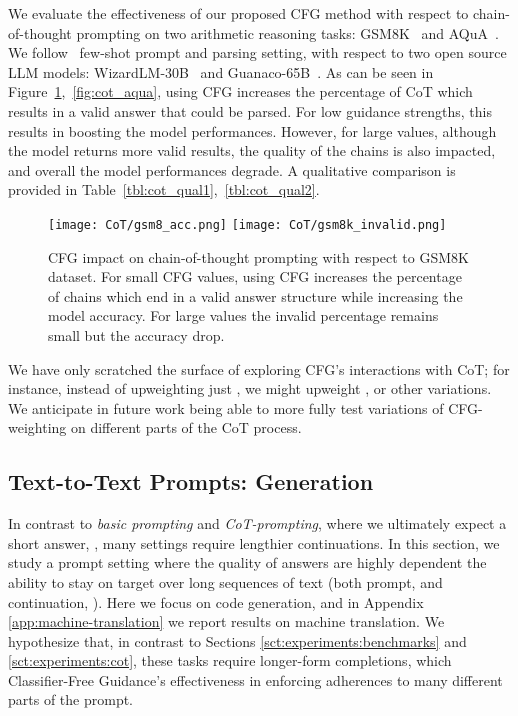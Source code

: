 \documentclass{article}
\begin{document}
 We evaluate the effectiveness of our proposed CFG method with respect to chain-of-thought prompting on two arithmetic reasoning tasks: GSM8K~\cite{gsm8k} and AQuA~\cite{aqua}. We follow~\cite{self-consistency} few-shot prompt and parsing setting, with respect to two open source LLM models: WizardLM-30B~\cite{xu2023wizardlm} and Guanaco-65B~\cite{guancano}.
As can be seen in Figure~\ref{fig:cot_GSM8K},~\ref{fig:cot_aqua}, using CFG increases the percentage of CoT which results in a valid answer that could be parsed. For low guidance strengths, this results in boosting the model performances. However, for large values, although the model returns more valid results, the quality of the chains is also impacted, and overall the model performances degrade. A qualitative comparison is provided in Table~\ref{tbl:cot_qual1},~\ref{tbl:cot_qual2}.  

\begin{figure}[!ht]
    \centering
    \texttt{[image: CoT/gsm8\_acc.png]}
    \texttt{[image: CoT/gsm8k\_invalid.png]}
    \caption{CFG impact on chain-of-thought prompting with respect to GSM8K dataset. For small CFG values, using CFG increases the percentage of chains which end in a valid answer structure while increasing the model accuracy. For large values the invalid percentage remains small but the accuracy drop.  }\label{fig:cot_GSM8K}
\end{figure}

We have only scratched the surface of exploring CFG's interactions with CoT; for instance, instead of upweighting just , we might upweight , or other variations. We anticipate in future work being able to more fully test variations of CFG-weighting on different parts of the CoT process.


\subsection{Text-to-Text Prompts: Generation}
\label{sct:experiments:text-to-text-generation}
In contrast to \textit{basic prompting} and \textit{CoT-prompting}, where we ultimately expect a short answer, , many settings require lengthier continuations. In this section, we study a prompt setting where the quality of answers are highly dependent the ability to stay on target over long sequences of text (both prompt,  and continuation, ). Here we focus on code generation, and in Appendix \ref{app:machine-translation} we report results on machine translation. We hypothesize that, in contrast to Sections \ref{sct:experiments:benchmarks} and \ref{sct:experiments:cot}, these tasks require longer-form completions, which Classifier-Free Guidance's effectiveness in enforcing adherences to many different parts of the prompt. 
\end{document}
